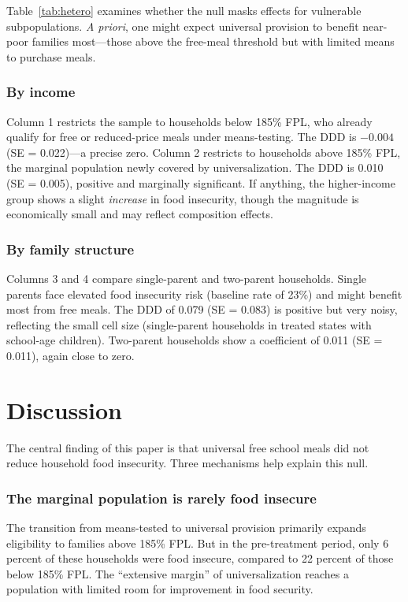 \documentclass[12pt]{article}
\begin{document}
Table~\ref{tab:hetero} examines whether the null masks effects for vulnerable subpopulations. \emph{A priori}, one might expect universal provision to benefit near-poor families most---those above the free-meal threshold but with limited means to purchase meals.

\subsubsection*{By income} Column 1 restricts the sample to households below 185\% FPL, who already qualify for free or reduced-price meals under means-testing. The DDD is $-0.004$ (SE = 0.022)---a precise zero. Column 2 restricts to households above 185\% FPL, the marginal population newly covered by universalization. The DDD is 0.010 (SE = 0.005), positive and marginally significant. If anything, the higher-income group shows a slight \emph{increase} in food insecurity, though the magnitude is economically small and may reflect composition effects.

\subsubsection*{By family structure} Columns 3 and 4 compare single-parent and two-parent households. Single parents face elevated food insecurity risk (baseline rate of 23\%) and might benefit most from free meals. The DDD of 0.079 (SE = 0.083) is positive but very noisy, reflecting the small cell size (single-parent households in treated states with school-age children). Two-parent households show a coefficient of 0.011 (SE = 0.011), again close to zero.




\section{Discussion}
\label{sec:discussion}

The central finding of this paper is that universal free school meals did not reduce household food insecurity. Three mechanisms help explain this null.

\subsubsection*{The marginal population is rarely food insecure} The transition from means-tested to universal provision primarily expands eligibility to families above 185\% FPL. But in the pre-treatment period, only 6 percent of these households were food insecure, compared to 22 percent of those below 185\% FPL. The ``extensive margin'' of universalization reaches a population with limited room for improvement in food security.
\end{document}
